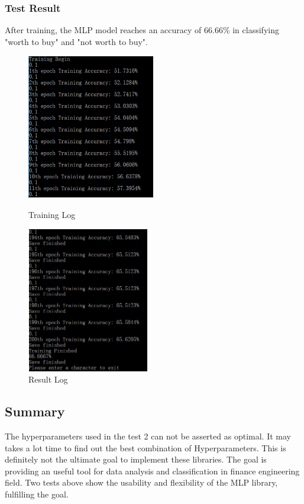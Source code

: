 \documentclass[a4paper]{article}
\begin{document}
\subsubsection{Test Result}
After training, the MLP model reaches an accuracy of 66.66\% in classifying "worth to buy" and "not worth to buy".
\begin{figure}[H]
\begin{minipage}[t]{0.5\textwidth}
\centering
\includegraphics[width=2.2in,height=2.5in]{pro.png}
\caption{Training Log}
\label{fig:side:a}
\end{minipage}%
\begin{minipage}[t]{0.5\textwidth}
\centering
\includegraphics[width=2.1in,height=2.5in]{res.png}
\caption{Result Log}
\label{fig:side:b}
\end{minipage}
\end{figure} 
\subsection{Summary}
The hyperparameters used in the test 2 can not be asserted as optimal. It may takes a lot time to find out the best combination of Hyperparameters. This is definitely not the ultimate goal to implement these libraries. The goal is providing an useful tool for data analysis and classification in finance engineering field. Two tests above show the usability and flexibility of the MLP library, fulfilling the goal.
\end{document}
